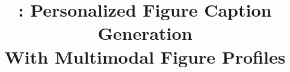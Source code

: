 \usepackage{xspace}
\usepackage{comment}
\usepackage{xcolor} %
\usepackage{booktabs}
\usepackage{siunitx}    %
\usepackage{tablefootnote}  %
\usepackage{threeparttable} %

\usepackage{amsmath}
\usepackage{cleveref}
\usepackage{multirow}
\usepackage{fvextra} %

\usepackage[utf8]{inputenc} 
\usepackage{CJKutf8}
\usepackage{siunitx}
\usepackage{listings}
\usepackage{tabularx}
\usepackage{enumitem}



\usepackage{soul}
\usepackage{hyperref}


\usepackage{colortbl}


\newcommand{\redbold}[1]{\textcolor{red}}


\title{\dataset: Personalized Figure Caption Generation\\With Multimodal Figure Profiles}

  
  



\newcommand{\eg}{{\it e.g.}\xspace}
\newcommand{\ie}{{\it i.e.}\xspace}
\newcommand{\etal}{{\it et al.}\xspace}

\newcommand{\dataset}{\mbox{\textsc{LaMP-Cap}}\xspace}


\renewcommand{\sectionautorefname}{Section}

